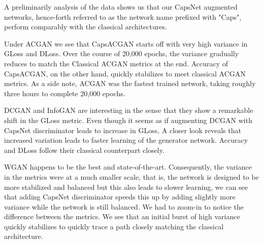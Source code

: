 A preliminarily analysis of the data shows us that our CapsNet augmented networks, hence-forth referred to as the network name prefixed with "Caps", perform comparably with the classical architectures. 
\par\bigskip

Under ACGAN we see that CapsACGAN starts off with very high variance in GLoss and DLoss. Over the course of 20,000 epochs, the variance gradually reduces to match the Classical ACGAN metrics at the end. Accuracy of CapsACGAN, on the other hand, quickly stabilizes to meet classical ACGAN metrics. As a side note, ACGAN was the fastest trained network, taking roughly three hours to complete 20,000 epochs.
\par\bigskip

DCGAN and InfoGAN are interesting in the sense that they show a remarkable shift in the GLoss metric. Even though it seems as if augmenting DCGAN with CapsNet discriminator leads to increase in GLoss, A closer look reveals that increased variation leads to faster learning of the generator network. Accuracy and DLoss follow their classical counterpart closely.
\par\bigskip

WGAN happens to be the best and state-of-the-art. Consequently, the variance in the metrics were at a much smaller scale, that is, the network is designed to be more stabilized and balanced but this also leads to slower learning, we can see that adding CapsNet discriminator speeds this up by adding slightly more variance while the network is still balanced. We had to zoom-in to notice the difference between the metrics. We see that an initial burst of high variance quickly stabilizes to quickly trace a path closely matching the classical architecture.
\par\bigskip

